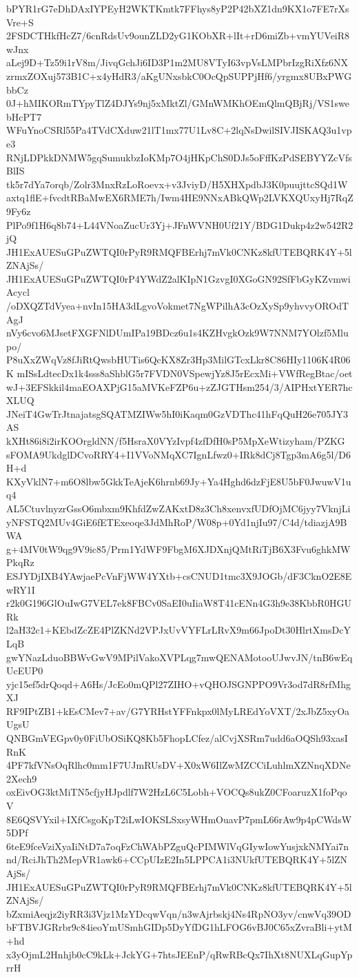 bPYR1rG7eDhDAxIYPEyH2WKTKmtk7FFhys8yP2P42bXZ1dn9KX1o7FE7rXsVre+S
2FSDCTHkfHcZ7/6cnRdsUv9ounZLD2yG1KObXR+lIt+rD6miZb+vmYUVeiR8wJnx
aLej9D+Tz59i1rV8m/JivqGchJi6ID3P1m2MU8VTyI63vpVsLMPbrIzgRiXfz6NX
zrmxZOXuj573B1C+x4yHdR3/aKgUNxsbkC0OcQpSUPPjHf6/yrgmx8UBxPWGbbCz
0J+hMIKORmTYpyTlZ4DJYs9nj5xMktZl/GMnWMKhOEmQlmQBjRj/VS1swebHcPT7
WFuYnoCSRl55Pa4TVdCXduw21lT1mx77U1Lv8C+2lqNsDwilSIVJISKAQ3u1vpe3
RNjLDPkkDNMW5gqSumukbzIoKMp7O4jHKpChS0DJs5oFffKzPdSEBYYZcVfsBlIS
tk5r7dYa7orqb/Zolr3MnxRzLoRoevx+v3JviyD/H5XHXpdbJ3K0puujttcSQd1W
axtq1flE+fvcdtRBaMwEX6RME7h/Iwm4HE9NNxABkQWp2LVKXQUxyHj7RqZ9Fy6z
PlPo9f1H6q8b74+L44VNoaZucUr3Yj+JFnWVNH0Uf21Y/BDG1Dukp4z2w542R2jQ
JH1ExAUESuGPuZWTQI0rPyR9RMQFBErhj7mVk0CNKz8kfUTEBQRK4Y+5lZNAjSs/
JH1ExAUESuGPuZWTQI0rP4YWdZ2alKIpN1GzvgI0XGoGN92SfFbGyKZvmwiAcycl
/oDXQZTdVyea+nvIn15HA3dLgvoVokmet7NgWPilhA3cOzXySp9yhvvyOROdTAgJ
nVy6cvo6MJsetFXGFNlDUmIPa19BDcz6u1s4KZHvgkOzk9W7NNM7YOlzf5Mlupo/
P8uXxZWqVz8fJiRtQwsbHUTis6QcKX8Zr3Hp3MilGTcxLkr8C86HIy1106K4R06K
mISsLdtecDx1k4sss8aShblG5r7FVDN0VSpewjYz8J5rEcxMi+VWfRegBtac/oet
wJ+3EFSkkil4maEOAXPjG15aMVKeFZP6u+zZJGTHsm254/3/AIPHxtYER7hcXLUQ
JNeiT4GwTrJtnajatsgSQATMZIWw5hI0iKaqm0GzVDThc41hFqQuH26e705JY3AS
kXHt86i8i2irKOOrgldNN/f5HsraX0VYzIvpf4zfDfH0sP5MpXeWtizyham/PZKG
sFOMA9UkdglDCvoRRY4+I1VVoNMqXC7IgnLfwz0+IRk8dCj8Tgp3mA6g5l/D6H+d
KXyVklN7+m6O8lbw5GkkTeAjeK6hrnb69Jy+Ya4Hghd6dzFjE8U5bF0JwuwV1uq4
AL5CtuvlnyzrGssO6mbxm9KhfdZwZAKxtD8z3Ch8xenvxfUDfOjMC6jyy7VknjLi
yNFSTQ2MUv4GiE6fETExeoqe3JdMhRoP/W08p+0Yd1njIu97/C4d/tdiazjA9BWA
g+4MV0tW9qg9V9ic85/Prm1YdWF9FbgM6XJDXnjQMtRiTjB6X3Fvu6ghkMWPkqRz
ESJYDjIXB4YAwjaePcVnFjWW4YXtb+csCNUD1tmc3X9JOGb/dF3CknO2E8EwRY1I
r2k0G196GlOuIwG7VEL7ek8FBCv0SaEI0uIiaW8T41cENn4G3h9e38KbbR0HGURk
l2aH32c1+KEbdZcZE4PlZKNd2VPJxUvVYFLrLRvX9m66JpoDt30HlrtXmsDcYLqB
gwYNazLduoBBWvGwV9MPilVakoXVPLqg7mwQENAMotooUJwvJN/tnB6wEqUcEUP0
yjc15ef5drQoqd+A6Hs/JcEo0mQPl27ZIHO+vQHOJSGNPPO9Vr3od7dR8rfMhgXJ
RF9IPtZB1+kEsCMev7+av/G7YRHstYFFnkpx0lMyLREdYoVXT/2xJbZ5xyOaUgsU
QNBGmVEGpv0y0FiUbOSiKQ8Kb5FhopLCfez/alCvjXSRm7udd6aOQSh93xasIRnK
4PF7kfVNsOqRlhc0mm1F7UJmRUsDV+X0xW6IlZwMZCCiLuhlmXZNnqXDNe2Xech9
oxEivOG3ktMiTN5cfjyHJpdlf7W2HzL6C5Lobh+VOCQs8ukZ0CFoaruzX1foPqoV
8E6QSVYxil+IXfCsgoKpT2iLwIOKSLSxsyWHmOuavP7pmL66rAw9p4pCWdsW5DPf
6teE9fceVziXyaIiNtD7a7oqFzChWAbPZguQcPIMWlVqGIywIowYusjxkNMYai7n
nd/RciJhTh2MepVR1awk6+CCpUIzE2In5LPPCA1i3NUkfUTEBQRK4Y+5lZNAjSs/
JH1ExAUESuGPuZWTQI0rPyR9RMQFBErhj7mVk0CNKz8kfUTEBQRK4Y+5lZNAjSs/
bZxmiAeqjz2iyRR3i3Vjz1MzYDcqwVqn/n3wAjrbskj4Ns4RpNO3yv/cnwVq39OD
bFTBVJGRrbr9c84ieoYmUSmhGIDp5DyYfDG1hLFOG6vBJ0C65xZvraBli+ytM+hd
x3yOjmL2Hnhjb0cC9kLk+JckYG+7htsJEEnP/qRwRBcQx7IhXt8NUXLqGupYprrH
